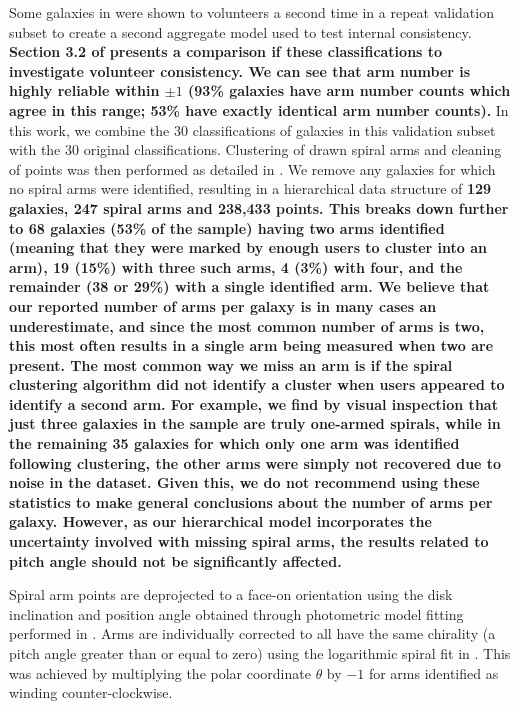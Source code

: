 Some galaxies in \citet{2020arXiv200610450L} were shown to volunteers a second time in a repeat validation subset to create a second aggregate model used to test internal consistency. {\bf Section 3.2 of \citet{2020arXiv200610450L} presents a comparison if these classifications to investigate volunteer consistency. We can see that arm number is highly reliable within $\pm1$ (93\% galaxies have arm number counts which agree in this range; 53\% have exactly identical arm number counts).} In this work, we combine the 30 classifications of galaxies in this validation subset with the 30 original classifications. Clustering of drawn spiral arms and cleaning of points was then performed as detailed in \citet{2020arXiv200610450L}. We remove any galaxies for which no spiral arms were identified, resulting in a hierarchical data structure of {\bf 129 galaxies, 247 spiral arms and 238,433 points. This breaks down further to 68 galaxies (53\% of the sample) having two arms identified (meaning that they were marked by enough users to cluster into an arm), 19 (15\%) with three such arms, 4 (3\%) with four, and the remainder (38 or 29\%) with a single identified arm. We believe that our reported number of arms per galaxy is in many cases an underestimate, and since the most common number of arms is two, this most often results in a single arm being measured when two are present. The most common way we miss an arm is if the spiral clustering algorithm did not identify a cluster when users appeared to identify a second arm.
For example, we find by visual inspection that just three galaxies in the sample are truly one-armed spirals, while in the remaining 35 galaxies for which only one arm was identified following clustering, the other arms were simply not recovered due to noise in the dataset. Given this, we do not recommend using these statistics to make general conclusions about the number of arms per galaxy. However, as our hierarchical model incorporates the uncertainty involved with missing spiral arms, the results related to pitch angle should not be significantly affected.}

Spiral arm points are deprojected to a face-on orientation using the disk inclination and position angle obtained through photometric model fitting performed in \citet{2020arXiv200610450L}. Arms are individually corrected to all have the same chirality (a pitch angle greater than or equal to zero) using the logarithmic spiral fit in \citet{2020arXiv200610450L}. This was achieved by multiplying the polar coordinate $\theta$ by $-1$ for arms identified as winding counter-clockwise.

